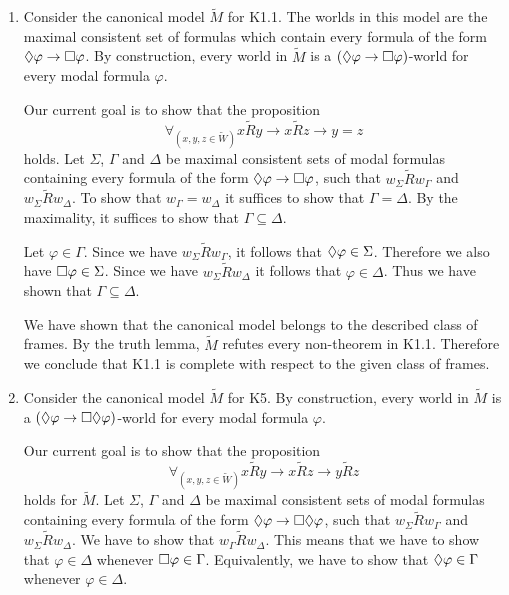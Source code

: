 \documentclass{article}
\begin{document}
\maketitle

\begin{ex}
\begin{enumerate}
\item Consider the canonical model $\tilde{M}$ for \textsf{K1.1}. The worlds in
this model are the maximal consistent set of formulas which contain every
formula of the form $\lozenge\varphi\to\square\varphi$. By construction,
every world in $\tilde{M}$ is a $(\lozenge\varphi\to\square\varphi)$-world for every
modal formula $\varphi$. 

Our current goal is to show that the proposition
\[
\forall_{(x,y,z\in\tilde{W})} x\mathbin{\tilde{R}} y\to x\mathbin{\tilde{R}} z\to y=z
\]
holds. Let $\Sigma$, $\Gamma$ and $\Delta$ be maximal consistent sets of modal
formulas containing every formula of the form $\lozenge\varphi\to\square\varphi$, such
that $w_\Sigma\mathbin{\tilde{R}} w_\Gamma$ and $w_\Sigma\mathbin{\tilde{R}} 
w_\Delta$. To show that $w_\Gamma=w_\Delta$ it suffices to show that
$\Gamma=\Delta$. By the maximality, it suffices to show that $\Gamma\subseteq
\Delta$.

Let $\varphi\in\Gamma$. Since we have $w_\Sigma\mathbin{\tilde{R}}w_\Gamma$, it
follows that $\lozenge\varphi\in\Sigma$. Therefore we also have $\square\varphi\in
\Sigma$. Since we have $w_\Sigma\mathbin{\tilde{R}}w_\Delta$ it follows that
$\varphi\in\Delta$. Thus we have shown that $\Gamma\subseteq\Delta$.

We have shown that the canonical model belongs to the described class of 
frames. By the truth lemma, $\tilde{M}$ refutes every non-theorem in 
\textsf{K1.1}. Therefore we conclude that \textsf{K1.1} is complete with
respect to the given class of frames.
\item Consider the canonical model $\tilde{M}$ for \textsf{K5}. By 
construction, every world in $\tilde{M}$ is a 
$(\lozenge\varphi\to\square\lozenge\varphi)$-world for every modal formula $\varphi$.

Our current goal is to show that the proposition
\[
\forall_{(x,y,z\in\tilde{W})} 
  x\mathbin{\tilde{R}}y\to x\mathbin{\tilde{R}} z\to y\mathbin{\tilde{R}} z
\]
holds for $\tilde{M}$. Let $\Sigma$, $\Gamma$ and $\Delta$ be maximal consistent
sets of modal formulas containing every formula of the form
$\lozenge\varphi\to\square\lozenge\varphi$, such that 
$w_\Sigma\mathbin{\tilde{R}}w_\Gamma$ and 
$w_\Sigma\mathbin{\tilde{R}}w_\Delta$. We have to show that
$w_\Gamma\mathbin{\tilde{R}}w_\Delta$. This means that we have to show that
$\varphi\in\Delta$ whenever $\square\varphi\in\Gamma$. Equivalently, we have to
show that $\lozenge\varphi\in\Gamma$ whenever $\varphi\in\Delta$. 


\end{enumerate}
\end{ex}
\end{document}
